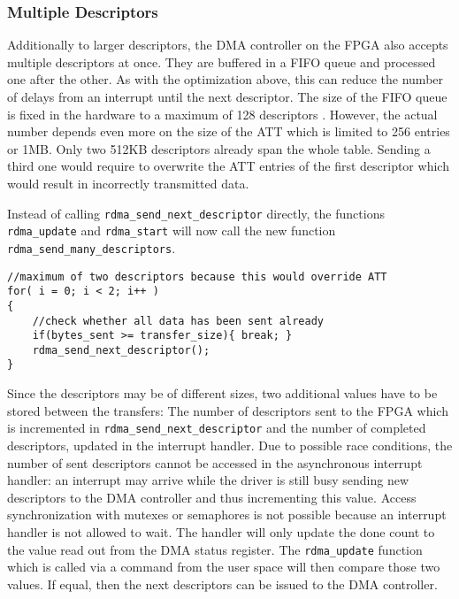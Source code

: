 \subsubsection*{Multiple Descriptors}

Additionally to larger descriptors, the DMA controller on the FPGA also accepts multiple descriptors at once.
They are buffered in a FIFO queue and processed one after the other.
As with the optimization above, this can reduce the number of delays from an interrupt until the next descriptor.
The size of the FIFO queue is fixed in the hardware to a maximum of 128 descriptors \cite{altera_driver}.
However, the actual number depends even more on the size of the ATT which is limited to 256 entries or 1MB.
Only two 512KB descriptors already span the whole table.
Sending a third one would require to overwrite the ATT entries of the first descriptor which would result in incorrectly transmitted data.

Instead of calling \texttt{rdma\_send\_next\_descriptor} directly, the functions \texttt{rdma\_update} and \texttt{rdma\_start} will now call the new function \texttt{rdma\_send\_many\_descriptors}.

\begin{lstlisting}[label=rdma_send_many, caption=Sending as many descriptors as possible or needed]
//maximum of two descriptors because this would override ATT
for( i = 0; i < 2; i++ )
{
	//check whether all data has been sent already
	if(bytes_sent >= transfer_size){ break; }
	rdma_send_next_descriptor();
}
\end{lstlisting}

Since the descriptors may be of different sizes, two additional values have to be stored between the transfers:
The number of descriptors sent to the FPGA which is incremented in \texttt{rdma\_send\_next\_descriptor} and the number of completed descriptors, updated in the interrupt handler.
Due to possible race conditions, the number of sent descriptors cannot be accessed in the asynchronous interrupt handler: an interrupt may arrive while the driver is still busy sending new descriptors to the DMA controller and thus incrementing this value.
Access synchronization with mutexes or semaphores is not possible because an interrupt handler is not allowed to wait.
The handler will only update the done count to the value read out from the DMA status register.
The \texttt{rdma\_update} function which is called via a command from the user space will then compare those two values.
If equal, then the next descriptors can be issued to the DMA controller.




